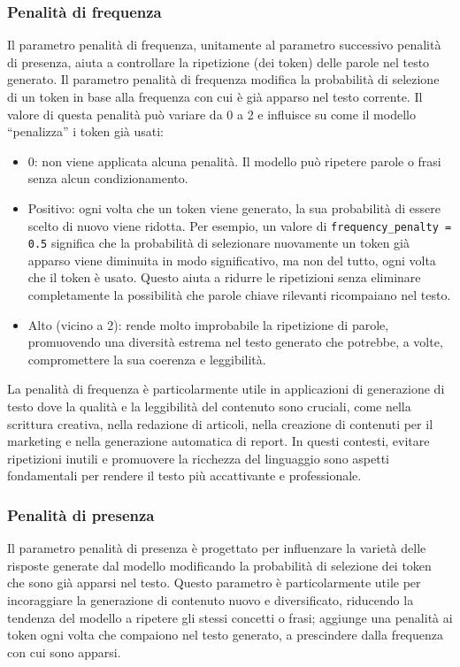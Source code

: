         \subsubsection{Penalità di frequenza}
            Il parametro penalità di frequenza, unitamente al parametro successivo penalità di presenza, aiuta a controllare la ripetizione (dei token) delle parole nel testo generato. Il parametro penalità di frequenza modifica la probabilità di selezione di un token in base alla frequenza con cui è già apparso nel testo corrente. Il valore di questa penalità può variare da 0 a 2 e influisce su come il modello ``penalizza'' i token già usati:
            \begin{itemize}
                \item 0: non viene applicata alcuna penalità. Il modello può ripetere parole o frasi senza alcun condizionamento.
            
                \item Positivo: ogni volta che un token viene generato, la sua probabilità di essere scelto di nuovo viene ridotta. Per esempio, un valore di \texttt{frequency\_penalty = 0.5} significa che la probabilità di selezionare nuovamente un token già apparso viene diminuita in modo significativo, ma non del tutto, ogni volta che il token è usato. Questo aiuta a ridurre le ripetizioni senza eliminare completamente la possibilità che parole chiave rilevanti ricompaiano nel testo.
            
                \item Alto (vicino a 2): rende molto improbabile la ripetizione di parole, promuovendo una diversità estrema nel testo generato che potrebbe, a volte, compromettere la sua coerenza e leggibilità.
            \end{itemize}
            
            La penalità di frequenza è particolarmente utile in applicazioni di generazione di testo dove la qualità e la leggibilità del contenuto sono cruciali, come nella scrittura creativa, nella redazione di articoli, nella creazione di contenuti per il marketing e nella generazione automatica di report. In questi contesti, evitare ripetizioni inutili e promuovere la ricchezza del linguaggio sono aspetti fondamentali per rendere il testo più accattivante e professionale.
            
        \subsubsection{Penalità di presenza}
            Il parametro penalità di presenza è progettato per influenzare la varietà delle risposte generate dal modello modificando la probabilità di selezione dei token che sono già apparsi nel testo. Questo parametro è particolarmente utile per incoraggiare la generazione di contenuto nuovo e diversificato, riducendo la tendenza del modello a ripetere gli stessi concetti o frasi; aggiunge una penalità ai token ogni volta che compaiono nel testo generato, a prescindere dalla frequenza con cui sono apparsi.

